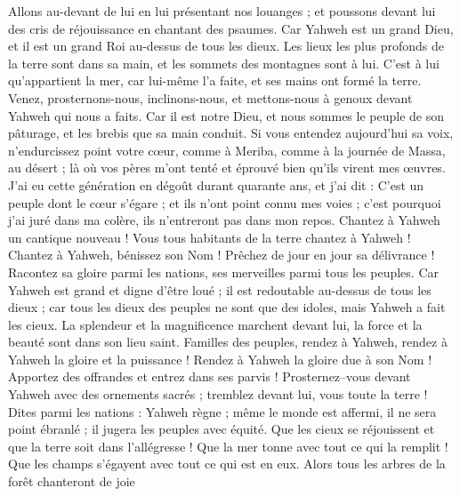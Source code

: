 \begin{multicols}{2}
Allons au-devant de lui en lui présentant nos louanges ; et poussons devant lui des cris de réjouissance en chantant des psaumes.
Car Yahweh est un grand Dieu, et il est un grand Roi au-dessus de tous les dieux.
Les lieux les plus profonds de la terre sont dans sa main, et les sommets des montagnes sont à lui.
C'est à lui qu'appartient la mer, car lui-même l'a faite, et ses mains ont formé la terre.
Venez, prosternons-nous, inclinons-nous, et mettons-nous à genoux devant Yahweh qui nous a faits.
Car il est notre Dieu, et nous sommes le peuple de son pâturage, et les brebis que sa main conduit. Si vous entendez aujourd'hui sa voix,
n'endurcissez point votre cœur, comme à Meriba, comme à la journée de Massa, au désert ;
là où vos pères m'ont tenté et éprouvé bien qu'ils virent mes œuvres.
J'ai eu cette génération en dégoût durant quarante ans, et j'ai dit : C'est un peuple dont le cœur s'égare ; et ils n'ont point connu mes voies ;
c'est pourquoi j'ai juré dans ma colère, ils n'entreront pas dans mon repos.
\VerseOne{}Chantez à Yahweh un cantique nouveau ! Vous tous habitants de la terre chantez à Yahweh !
Chantez à Yahweh, bénissez son Nom ! Prêchez de jour en jour sa délivrance !
Racontez sa gloire parmi les nations, ses merveilles parmi tous les peuples.
Car Yahweh est grand et digne d'être loué ; il est redoutable au-dessus de tous les dieux ;
car tous les dieux des peuples ne sont que des idoles, mais Yahweh a fait les cieux.
La splendeur et la magnificence marchent devant lui, la force et la beauté sont dans son lieu saint.
Familles des peuples, rendez à Yahweh, rendez à Yahweh la gloire et la puissance !
Rendez à Yahweh la gloire due à son Nom ! Apportez des offrandes et entrez dans ses parvis !
Prosternez–vous devant Yahweh avec des ornements sacrés ; tremblez devant lui, vous toute la terre !
Dites parmi les nations : Yahweh règne ; même le monde est affermi, il ne sera point ébranlé ; il jugera les peuples avec équité.
Que les cieux se réjouissent et que la terre soit dans l'allégresse ! Que la mer tonne avec tout ce qui la remplit !
Que les champs s'égayent avec tout ce qui est en eux. Alors tous les arbres de la forêt chanteront de joie

\end{multicols}
